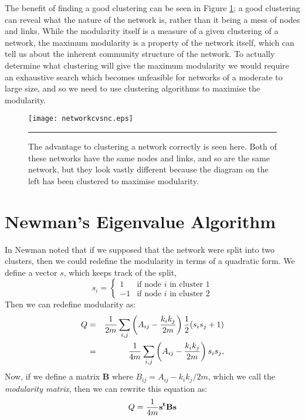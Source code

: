 \documentclass[a4paper,12pt]{report}
\begin{document}
The benefit of finding a good clustering can be seen in Figure \ref{netclus}; 
a good clustering can reveal what the nature of the network is, rather than it 
being a mess of nodes and links.  While the modularity itself is a measure of a 
given clustering of a network, the maximum modularity is a property of the 
network itself, which can tell us about the inherent community structure of the 
network. To actually determine what clustering will give the maximum modularity 
we would require an exhaustive search which becomes unfeasible for networks of 
a moderate to large size, and so we need to use clustering algorithms to 
maximise the modularity.

\begin{figure}[t]
  \centering
  \texttt{[image: networkcvsnc.eps]}
  \rule{35em}{0.5pt}
  \caption{The advantage to clustering a network correctly is seen here.  Both 
    of these networks have the same nodes and links, and so are the same 
    network, but they look vastly different because the diagram on the left 
    has been clustered to maximise modularity.}
  \label{netclus}
\end{figure}


\section{Newman's Eigenvalue Algorithm}

In \cite{Newman2006a} Newman noted that if we supposed that the network were 
split into two clusters, then we could redefine the modularity in terms of a
quadratic form.  We define a vector $s$, which keeps track of the
split,
$$
s_i = \left\{ \begin{array}{ll} 1 & \mbox{if node $i$ in cluster 1}
  \\ -1 & \mbox{if node $i$ in cluster 2}\end{array} \right.
$$
Then we can redefine modularity as:
\begin{eqnarray}
Q & = & \frac{1}{2m}\sum_{i,j} \left(A_{ij} - \frac{k_ik_j}{2m}\right)\frac{1}{2}(s_is_j + 1)\cr
& = &\frac{1}{4m}\sum_{i,j} \left(A_{ij} - \frac{k_ik_j}{2m}\right)s_is_j,
\end{eqnarray}
Now, if we define a matrix $\mathbf{B}$ where 
$B_{ij} = A_{ij} - k_ik_j/2m$, which we call the {\sl modularity matrix}, 
then we can rewrite this equation as:
\begin{equation}
Q = \frac{1}{4m}{\bf s^tBs}
\end{equation}
\end{document}
